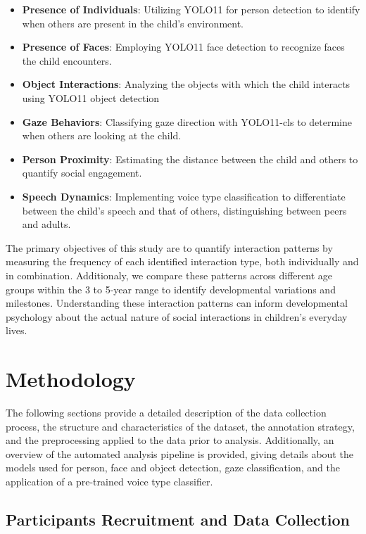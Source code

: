 \documentclass[
  man,floatsintext]{apa6}
\providecommand{\tightlist}{%
  \setlength{\itemsep}{0pt}\setlength{\parskip}{0pt}}
\begin{document}
\begin{itemize}
\tightlist
\item
  \textbf{Presence of Individuals}: Utilizing YOLO11 for person detection to identify when others are present in the child's environment.
\item
  \textbf{Presence of Faces}: Employing YOLO11 face detection to recognize faces the child encounters.
\item
  \textbf{Object Interactions}: Analyzing the objects with which the child interacts using YOLO11 object detection
\item
  \textbf{Gaze Behaviors}: Classifying gaze direction with YOLO11-cls to determine when others are looking at the child.
\item
  \textbf{Person Proximity}: Estimating the distance between the child and others to quantify social engagement.
\item
  \textbf{Speech Dynamics}: Implementing voice type classification to differentiate between the child's speech and that of others, distinguishing between peers and adults.
\end{itemize}

The primary objectives of this study are to quantify interaction patterns by measuring the frequency of each identified interaction type, both individually and in combination. Additionaly, we compare these patterns across different age groups within the 3 to 5-year range to identify developmental variations and milestones. Understanding these interaction patterns can inform developmental psychology about the actual nature of social interactions in children's everyday lives.

\section{Methodology}\label{methodology}

The following sections provide a detailed description of the data collection process, the structure and characteristics of the dataset, the annotation strategy, and the preprocessing applied to the data prior to analysis. Additionally, an overview of the automated analysis pipeline is provided, giving details about the models used for person, face and object detection, gaze classification, and the application of a pre-trained voice type classifier.

\subsection{Participants Recruitment and Data Collection}\label{participants}
\end{document}

